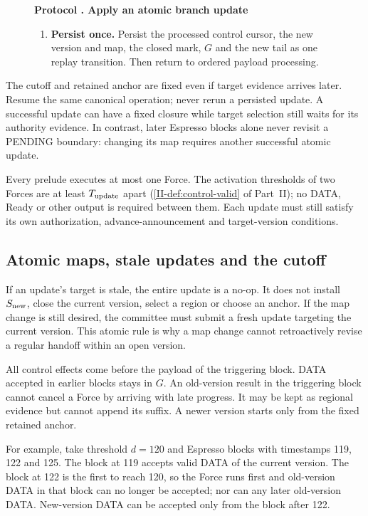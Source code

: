 \documentclass[11pt,a4paper]{article}
\newcounter{protocol}
\newenvironment{protocol}[3][htbp]{\begin{figure}[#1]\refstepcounter{protocol}\label{#2}
\begin{mdframed}[linewidth=.6pt,skipabove=0pt,skipbelow=0pt,
innertopmargin=7pt,innerbottommargin=7pt]\small
\textbf{Protocol \theprotocol. #3}\par\smallskip}{\end{mdframed}\end{figure}}
\begin{document}
\begin{protocol}{alg:force}{Apply an atomic branch update}
\begin{enumerate}[label=\textbf{\arabic*)},itemsep=3pt]
\item \textbf{Persist once.}
Persist the processed control cursor, the new version and map, the closed
mark, $G$ and the new tail as one replay transition. Then return to
ordered payload processing.
\end{enumerate}
\end{protocol}

The cutoff and retained anchor are fixed even if target evidence arrives
later. Resume the same canonical operation; never rerun a persisted
update. A successful update can have a fixed closure while target
selection still waits for its authority evidence. In contrast, later
Espresso blocks alone never revisit a PENDING boundary: changing its map
requires another successful atomic update.

Every prelude executes at most one Force. The activation thresholds of
two Forces are at least $T_{\rm update}$ apart
(\cref{II-def:control-valid} of Part~II); no DATA, Ready or other output is required
between them.
Each update must still satisfy its own authorization,
advance-announcement and target-version conditions.

\subsection{Atomic maps, stale updates and the cutoff}
If an update's target is stale, the entire update is a no-op. It does not
install $S_{\rm new}$, close the current version, select a region or
choose an anchor. If the map change is still desired, the committee must
submit a fresh update targeting the current version. This atomic rule is
why a map change cannot retroactively revise a regular handoff within an
open version.

All control effects come before the payload of the triggering block.
DATA accepted in earlier blocks stays in $G$. An old-version result in
the triggering block cannot cancel a Force by arriving with late
progress. It may be kept as regional evidence but cannot append its
suffix. A newer version starts only from the fixed retained anchor.

For example, take threshold $d=120$ and Espresso blocks with timestamps
119, 122 and 125. The block at 119 accepts valid DATA of the current
version. The block at 122 is the first to reach 120, so the Force runs
first and old-version DATA in that block can no longer be accepted;
nor can any later old-version DATA. New-version DATA can be accepted only
from the block after 122.
\end{document}
